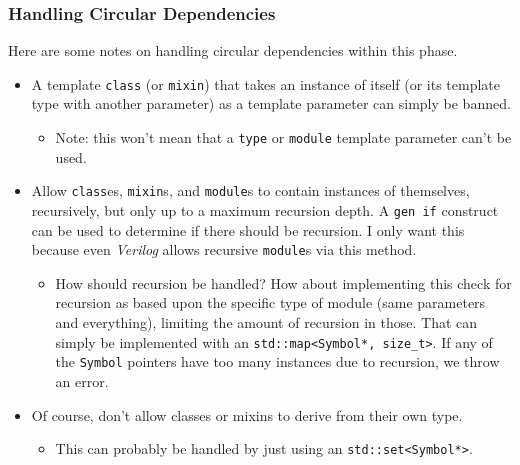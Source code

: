 \documentclass{article}
\begin{document}
		\subsubsection{Handling Circular Dependencies}
		Here are some notes on handling circular dependencies within this
		phase.
		\begin{itemize}
		\item A template \texttt{class} (or \texttt{mixin}) that takes
			an instance of itself (or its template type with another
			parameter) as a template parameter can simply be banned.
			\begin{itemize}
			\item Note:  this won't mean that a \texttt{type} or
				\texttt{module} template parameter can't be used.
			\end{itemize}
		\item Allow \texttt{class}es, \texttt{mixin}s, and
			\texttt{module}s to contain instances of themselves,
			recursively, but only up to a maximum recursion depth.  A
			\texttt{gen if} construct can be used to determine
			if there should be recursion.  I only want this because even
			\textit{Verilog} allows recursive \texttt{module}s via this
			method.
			\begin{itemize}
			\item How should recursion be handled?  How about implementing
				this check for recursion as based upon the specific type of
				module (same parameters and everything), limiting the
				amount of recursion in those.  That can simply be
				implemented with an \texttt{std::map<Symbol*, size\_t>}.
				If any of the \texttt{Symbol} pointers have too many
				instances due to recursion, we throw an error.
			\end{itemize}
		\item Of course, don't allow classes or mixins to derive from their
			own type.
			\begin{itemize}
			\item This can probably be handled by just using an
				\texttt{std::set<Symbol*>}.
			\end{itemize}
		\end{itemize}




\end{document}
